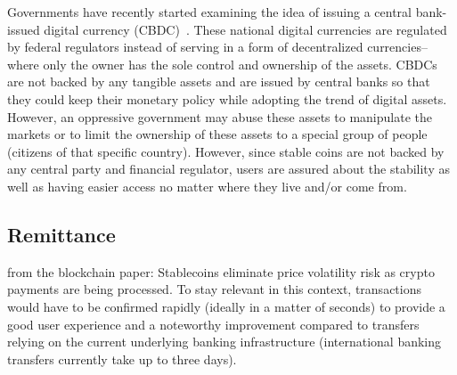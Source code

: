 Governments have recently started examining  the idea of issuing a central bank-issued digital currency (CBDC)~\cite{barrdear2016macroeconomics}. These national digital currencies are regulated by federal regulators instead of serving in a form of decentralized currencies-- where only the owner has the sole control and ownership of the assets. CBDCs are not backed by any tangible assets and are issued by central banks so that they could keep their monetary policy while adopting the trend of digital assets. However, an oppressive government may abuse these assets to manipulate the markets or to limit the ownership of these assets to  a special group of people (\eg citizens of that specific country). However, since stable coins are not backed by any central party and financial regulator, users are assured about the stability as well as having easier access no matter where they live and/or come from.

\subsection{Remittance}
from the blockchain paper:
Stablecoins eliminate price volatility risk as crypto payments are being processed. To stay relevant in this
context, transactions would have to be confirmed rapidly (ideally in a matter of seconds) to provide a good
user experience and a noteworthy improvement compared to transfers relying on the current underlying
banking infrastructure (international banking transfers currently take up to three days).

